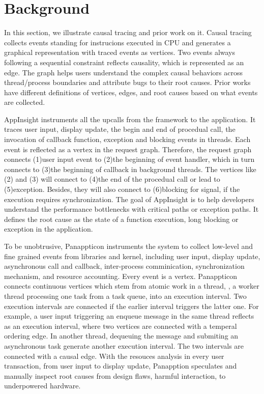 \section{Background} \label{sec:background}

In this section, we illustrate causal tracing and prior work on it. Causal
tracing collects events standing for instrucions executed in CPU and generates
a graphical representation with traced events as vertices. Two events always
following a sequential constraint reflects causality, which is represented
as an edge. The graph helps users understand the complex causal behaviors across
thread/process boundaries and attribute bugs to their root causes. Prior works
have different definitions of vertices, edges, and root causes based on what
events are collected.

AppInsight instruments all the upcalls from the framework to the application.
It traces user input, display update, the begin and end of procedual call, the
invocation of callback function, exception and blocking events in threads. Each
event is reflected as a vertex in the request graph. Therefore, the request
graph connects (1)user input event to (2)the beginning of event handler, which
in turn connects to (3)the beginning of callback in background threads. The
vertices like (2) and (3) will connect to (4)the end of the procedual call
or lead to (5)exception. Besides, they will also connect to (6)blocking for
signal, if the execution requires synchronization. The goal of AppInsight is to
help developers understand the performance bottlenecks with critical paths or
exception paths. It defines the root cause as the state of a function execution,
long blocking or exception in the application.

To be unobtrusive, Panappticon instruments the system to collect low-level
and fine grained events from libraries and kernel, including user input,
display update, asynchronous call and callback, inter-process comminication,
synchronization mechanism, and resource accounting. Every event is a vertex.
Panappticon connects continuous vertices which stem from atomic work in a
thread, \eg, a worker thread processing one task from a task queue, into an
execution interval. Two execution intervals are connected if the earlier
interval triggers the latter one. For example, a user input triggering an
enqueue message in the same thread reflects as an execution interval, where
two vertices are connected with a temperal ordering edge. In another thread,
dequeuing the message and submiting an asynchronous task generate another
execution interval. The two intervals are connected with a causal edge. With the
resouces analysis in every user transaction, from user input to display update,
Panapption speculates and manually inspect root causes from design flaws, harmful
interaction, to underpowered hardware.
